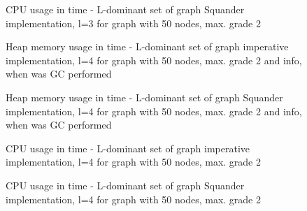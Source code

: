 \documentclass[11pt,twoside,a4paper]{book}
\begin{document}
\begin{figure}[ht]
\begin{center}

\caption{CPU usage in time - L-dominant set of graph Squander
implementation, l=3 for graph with 50 nodes, max. grade 2}
\label{fig:ldsgSCpu5023}
\end{center}
\end{figure}




\begin{figure}
\begin{center}

\caption{Heap memory usage in time - L-dominant set of graph imperative
implementation, l=4 for graph with 50 nodes, max. grade 2 and info, when was GC
performed}
\label{fig:ldsgIMem5024}
\end{center}
\end{figure}





\begin{figure}
\begin{center}

\caption{Heap memory usage in time - L-dominant set of graph Squander
implementation, l=4 for graph with 50 nodes, max. grade 2 and info, when was GC
performed}
\label{fig:ldsgSMem5024}
\end{center}
\end{figure}


\begin{figure}
\begin{center}

\caption{CPU usage in time - L-dominant set of graph imperative
implementation, l=4 for graph with 50 nodes, max. grade 2}
\label{fig:ldsgICpu5024}
\end{center}
\end{figure}


\begin{figure}[ht]
\begin{center}

\caption{CPU usage in time - L-dominant set of graph Squander
implementation, l=4 for graph with 50 nodes, max. grade 2}
\label{fig:ldsgSCpu5024}
\end{center}
\end{figure}
\end{document}
